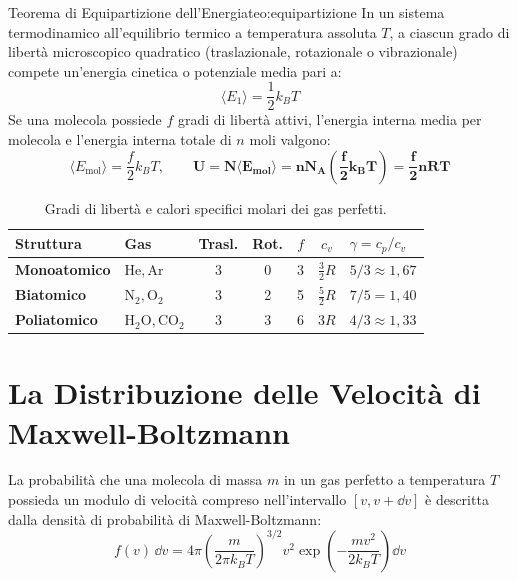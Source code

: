 \begin{teorema}{Teorema di Equipartizione dell'Energia}{teo:equipartizione}
In un sistema termodinamico all'equilibrio termico a temperatura assoluta $T$, a ciascun grado di libertà microscopico quadratico (traslazionale, rotazionale o vibrazionale) compete un'energia cinetica o potenziale media pari a:
\begin{equation}
    \langle E_1 \rangle = \frac{1}{2}k_B T
\end{equation}
Se una molecola possiede $f$ gradi di libertà attivi, l'energia interna media per molecola e l'energia interna totale di $n$ moli valgono:
\begin{equation}
    \langle E_{\text{mol}}\rangle = \frac{f}{2}k_B T, \qquad \mathbf{U = N \langle E_{\text{mol}}\rangle = n N_A \left(\frac{f}{2}k_B T\right) = \frac{f}{2}n R T}
    \label{eq:energia_interna_f}
\end{equation}
\end{teorema}

\begin{table}[htbp]
\centering
\caption{Gradi di libertà e calori specifici molari dei gas perfetti.}
\label{tab:equipartizione_gas}
\begin{tabularx}{\textwidth}{p{3.2cm} p{1.8cm} cccc X}
\toprule
\textbf{Struttura} & \textbf{Gas} & \textbf{Trasl.} & \textbf{Rot.} & \textbf{$f$} & \textbf{$c_v$} & \textbf{$\gamma = c_p/c_v$} \\
\midrule
\textbf{Monoatomico} & $\mathrm{He, Ar}$ & 3 & 0 & 3 & $\frac{3}{2}R$ & $5/3 \approx 1{,}67$ \\
\textbf{Biatomico} & $\mathrm{N_2, O_2}$ & 3 & 2 & 5 & $\frac{5}{2}R$ & $7/5 = 1{,}40$ \\
\textbf{Poliatomico} & $\mathrm{H_2O, CO_2}$ & 3 & 3 & 6 & $3R$ & $4/3 \approx 1{,}33$ \\
\bottomrule
\end{tabularx}
\end{table}

\section{La Distribuzione delle Velocità di Maxwell-Boltzmann}
\label{sec:maxwell_boltzmann}

La probabilità che una molecola di massa $m$ in un gas perfetto a temperatura $T$ possieda un modulo di velocità compreso nell'intervallo $[v, v+\dd v]$ è descritta dalla densità di probabilità di Maxwell-Boltzmann:
\begin{equation}
    f(v)\,\dd v = 4\pi \left(\frac{m}{2\pi k_B T}\right)^{3/2} v^2 \exp\left(-\frac{m v^2}{2 k_B T}\right)\dd v
    \label{eq:maxwell_boltzmann}
\end{equation}

